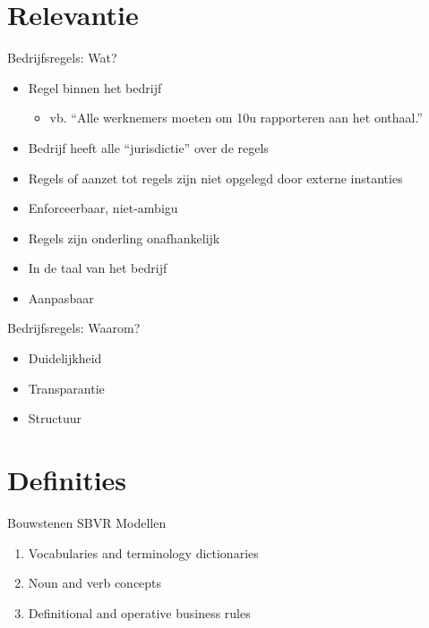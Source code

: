 \documentclass[t,12pt,english
\ifx\beamermode\undefined\else,\beamermode\fi
]{beamer}
\begin{document}
\section{Relevantie}
\begin{frame}{Bedrijfsregels: Wat?}
\begin{itemize}
	\item Regel binnen het bedrijf
	\begin{itemize}
		\item vb. ``Alle werknemers moeten om 10u rapporteren aan het onthaal.''
	\end{itemize}
	\item Bedrijf heeft alle ``jurisdictie'' over de regels
	\item Regels of aanzet tot regels zijn niet opgelegd door externe instanties
	\item Enforceerbaar, niet-ambigu
	\item Regels zijn onderling onafhankelijk
	\item In de taal van het bedrijf
	\item Aanpasbaar
\end{itemize}
\end{frame}

\begin{frame}{Bedrijfsregels: Waarom?}
\begin{itemize}
	\item Duidelijkheid
	\item Transparantie
	\item Structuur
\end{itemize}
\end{frame}
\section{Definities}

\begin{frame}{Bouwstenen SBVR Modellen}
	\begin{enumerate}
		\item Vocabularies and terminology dictionaries
		\item Noun and verb concepts
		\item Definitional and operative business rules
	\end{enumerate}
\end{frame}
\end{document}
